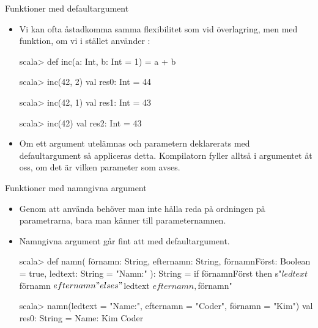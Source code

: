 \begin{Slide}{Funktioner med defaultargument}\SlideFontSmall

\begin{itemize}
\item Vi kan ofta åstadkomma samma flexibilitet som vid överlagring, men med  funktion, om vi i stället använder :
\begin{REPLnonum}
scala> def inc(a: Int, b: Int = 1) = a + b

scala> inc(42, 2)
val res0: Int = 44

scala> inc(42, 1)
val res1: Int = 43

scala> inc(42)
val res2: Int = 43

\end{REPLnonum}
\item Om ett argument utelämnas och parametern deklarerats med defaultargument så appliceras detta. Kompilatorn fyller alltså i argumentet åt oss, om det är  vilken parameter som avses.
\end{itemize}
\end{Slide}


\begin{Slide}{Funktioner med namngivna argument}
\begin{itemize}\SlideFontTiny
\item Genom att använda  behöver man inte hålla reda på ordningen på parametrarna, bara man känner till parameternamnen.
\item Namngivna argument går fint att  med defaultargument.
\begin{REPLnonum}[basicstyle=\SlideFontSize{7}{9}\ttfamily\color{white}]
scala> def namn(
         förnamn: String,
         efternamn: String,
         förnamnFörst: Boolean = true,
         ledtext: String = "Namn:"
       ): String = 
         if förnamnFörst 
         then s"$ledtext $förnamn $efternamn"
         else s"$ledtext $efternamn, $förnamn"

scala> namn(ledtext = "Name:", efternamn = "Coder", förnamn = "Kim")
val res0: String = Name: Kim Coder
\end{REPLnonum}
\end{itemize}
\end{Slide}


